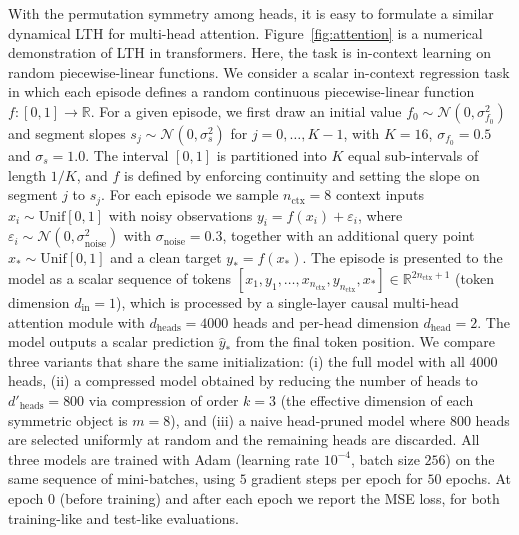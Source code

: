 \documentclass{article}
\theoremstyle{plain}
\newenvironment{REV*}
  {\begingroup\color[HTML]{000000}}
  {\endgroup}
\begin{document}
\begin{REV*}
With the permutation symmetry among heads, it is easy to formulate a similar dynamical LTH for multi-head attention. Figure~\ref{fig:attention} is a numerical demonstration of LTH in transformers. Here, the task is in-context learning on random piecewise-linear functions. We consider a scalar in-context regression task in which each episode defines a random continuous piecewise-linear function $f:[0,1]\to\mathbb{R}$. For a given episode, we first draw an initial value $f_0 \sim \mathcal{N}(0,\sigma_{f_0}^2)$ and segment slopes $s_j \sim \mathcal{N}(0,\sigma_s^2)$ for $j=0,\dots,K-1$, with $K=16$, $\sigma_{f_0}=0.5$ and $\sigma_s=1.0$. The interval $[0,1]$ is partitioned into $K$ equal sub-intervals of length $1/K$, and $f$ is defined by enforcing continuity and setting the slope on segment $j$ to $s_j$. For each episode we sample $n_{\mathrm{ctx}}=8$ context inputs $x_i \sim \mathrm{Unif}[0,1]$ with noisy observations $y_i = f(x_i) + \varepsilon_i$, where $\varepsilon_i \sim \mathcal{N}(0,\sigma_{\mathrm{noise}}^2)$ with $\sigma_{\mathrm{noise}} = 0.3$, together with an additional query point $x_\ast \sim \mathrm{Unif}[0,1]$ and a clean target $y_\ast = f(x_\ast)$. The episode is presented to the model as a scalar sequence of tokens $[x_1, y_1, \dots, x_{n_{\mathrm{ctx}}}, y_{n_{\mathrm{ctx}}}, x_\ast] \in \mathbb{R}^{2n_{\mathrm{ctx}}+1}$ (token dimension $d_{\mathrm{in}}=1$), which is processed by a single-layer causal multi-head attention module with $d_{\mathrm{heads}} = 4000$ heads and per-head dimension $d_{\mathrm{head}} = 2$. The model outputs a scalar prediction $\hat{y}_\ast$ from the final token position. We compare three variants that share the same initialization: (i) the full model with all $4000$ heads, (ii) a compressed model obtained by reducing the number of heads to $d'_{\mathrm{heads}} = 800$ via compression of order $k=3$ (the effective dimension of each symmetric object is $m=8$), and (iii) a naive head-pruned model where $800$ heads are selected uniformly at random and the remaining heads are discarded. All three models are trained with Adam (learning rate $10^{-4}$, batch size $256$) on the same sequence of mini-batches, using $5$ gradient steps per epoch for $50$ epochs. At epoch $0$ (before training) and after each epoch we report the MSE loss, for both training-like and test-like evaluations.


\end{REV*}
\end{document}
